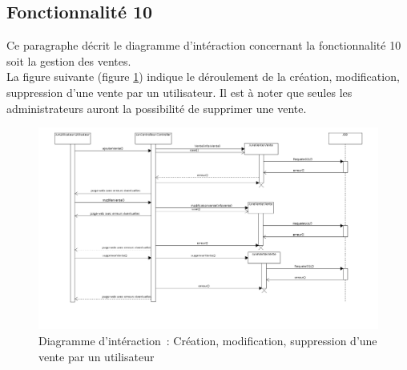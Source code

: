 \subsection{Fonctionnalité 10}
Ce paragraphe décrit le diagramme d'intéraction concernant la fonctionnalité 10 soit la gestion des ventes. \\

La figure suivante (figure \ref{diagrammeInteraction3}) indique le déroulement de la création, modification, suppression d’une vente par un utilisateur. Il est à noter que seules les administrateurs auront la possibilité de supprimer une vente.
\begin{figure}[H]
	\centering
	\includegraphics[scale=0.35]{images/diagrammesInteraction/03_diagrammeInteractionF10.png}
	\caption{Diagramme d'intéraction~: Création, modification, suppression d’une vente par un utilisateur}
	\label{diagrammeInteraction3}
\end{figure}



